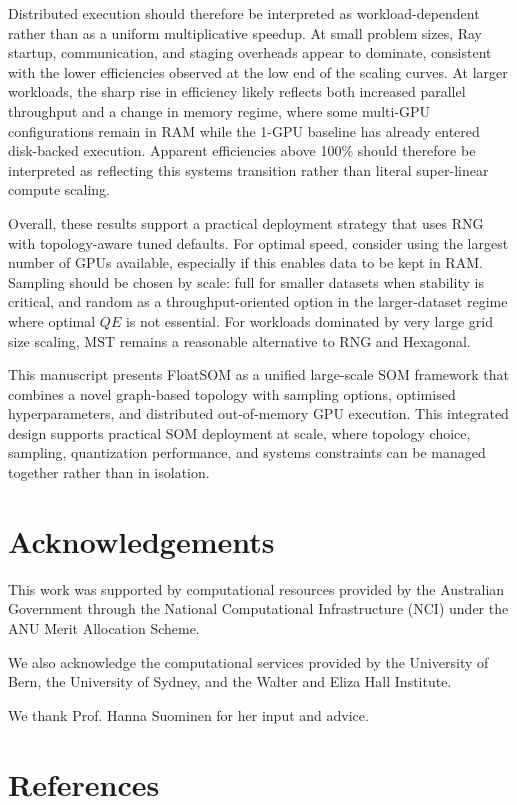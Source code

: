 \documentclass[11pt]{article}
\begin{document}
Distributed execution should therefore be interpreted as workload-dependent rather than as a uniform multiplicative speedup. At small problem sizes, Ray startup, communication, and staging overheads appear to dominate, consistent with the lower efficiencies observed at the low end of the scaling curves. At larger workloads, the sharp rise in efficiency likely reflects both increased parallel throughput and a change in memory regime, where some multi-GPU configurations remain in RAM while the 1-GPU baseline has already entered disk-backed execution. Apparent efficiencies above 100\% should therefore be interpreted as reflecting this systems transition rather than literal super-linear compute scaling.

Overall, these results support a practical deployment strategy that uses RNG with topology-aware tuned defaults. For optimal speed, consider using the largest number of GPUs available, especially if this enables data to be kept in RAM. Sampling should be chosen by scale: full for smaller datasets when stability is critical, and random as a throughput-oriented option in the larger-dataset regime where optimal $QE$ is not essential. For workloads dominated by very large grid size scaling, MST remains a reasonable alternative to RNG and Hexagonal.

This manuscript presents FloatSOM as a unified large-scale SOM framework that combines a novel graph-based topology with sampling options, optimised hyperparameters, and distributed out-of-memory GPU execution. This integrated design supports practical SOM deployment at scale, where topology choice, sampling, quantization performance, and systems constraints can be managed together rather than in isolation.

\section{Acknowledgements}

This work was supported by computational resources provided by the Australian Government through the National Computational Infrastructure (NCI) under the ANU Merit Allocation Scheme.

We also acknowledge the computational services provided by the University of Bern, the University of Sydney, and the Walter and Eliza Hall Institute.

We thank Prof. Hanna Suominen for her input and advice.

\section{References}
\renewcommand{\bibsection}{}


\end{document}
